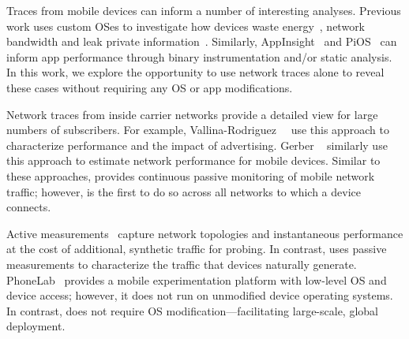 Traces from mobile devices can inform a number of interesting analyses. Previous work 
uses custom OSes to investigate how devices waste energy~\cite{pathak:eprof}, network bandwidth and 
leak private information~\cite{enck:taintdroid,hornyack:appfence}. Similarly, AppInsight~\cite{ravindranath:appinsight} and PiOS~\cite{egele:pios} can inform 
app performance through binary instrumentation and/or static analysis. In this work, we explore the opportunity to use network traces 
alone to reveal these cases without requiring any OS or app modifications. 

Network traces from inside carrier networks provide a detailed view for large numbers 
of subscribers. For example, Vallina-Rodriguez~\etal~\cite{vallina-rod:ads} use this approach to characterize performance and 
the impact of advertising. Gerber \etal~\cite{gerber:passivespeed} similarly use this approach to 
estimate network performance for mobile devices.  %
Similar to these approaches, \platname provides continuous passive monitoring of mobile network 
traffic; however, \platname is the first to do so across all networks to which a device connects.

Active measurements~\cite{wang:middleboxes,sommers:cellwifi} capture network topologies and instantaneous 
performance at the cost of additional, synthetic traffic for probing. In contrast, \platname uses 
passive measurements to characterize the traffic that devices
naturally generate. PhoneLab~\cite{PhoneLab} provides a mobile experimentation platform with 
low-level OS and device access; however, it does not run on unmodified device operating systems. 
In contrast, \meddle does not require OS modification---facilitating large-scale, global deployment.




